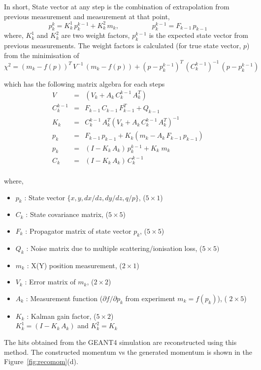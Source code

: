 In short, State vector at any step is the combination of extrapolation from previous
measurement and measurement at that point,
$$  p^k_k = K^1_k \,p^{k-1}_k + K^2_k \,m_k, \hspace{2cm} p_k^{k-1} = F_{k-1}\,p_{k-1}$$
where,  $K^1_k$ and $K^2_k$ are two weight factors, $p^{k-1}_k$ is the expected state
vector from previous measurements. The weight factors is calculated
(for true state vector, $p$) from the minimisation of
$$\chi^2  = (m_k - f(p))^T \,V^{-1}\, (m_k - f(p)) + (p - p_k^{k-1})^T \,(C^{k-1}_k)^{-1} \,(p - p_k^{k-1})$$

which has the following matrix algebra for each steps
\begin{eqnarray*}
  V &=& (V_k + A_k \,C_k^{k-1} \,A_k^T) \\
  C^{k-1}_k &=& F_{k-1}\, C_{k-1}\, F^T_{k-1} + Q_{k-1} \\
  K_k &=& C^{k-1}_k\, A_k^T (V_k + A_k\, C^{k-1}_k\, A_k^T)^{-1} \\
  p_k &=& F_{k-1}\, p_{k-1} + K_k (m_k - A_k \,F_{k-1}\,p_{k-1}) \\
  p_k &=& (I-K_k\,A_k)\, p_k^{k-1} + K_k\;m_k \\
  C_k &=& (I - K_k\, A_k)\, C_k^{k-1} \\
\end{eqnarray*}

where,
\begin{itemize}
\item $p_k$ : State vector $ \{x, y, dx/dz, dy/dz, q/p\}$, ($5 \times 1$)
\item $C_k$ : State covariance matrix, ($5 \times 5$)
\item $F_k$ : Propagator matrix of state vector $p_k$, ($5 \times 5$)
\item $Q_k$ : Noise matrix due to multiple scattering/ionisation loss, ($5 \times5) $
\item $m_k$ : X(Y) position measurement, ($2 \times 1$)
\item $V_k$ : Error matrix of $m_k$, ($2 \times 2$)
\item $A_k$ : Measurement function ($\partial f /\partial p_k$ from experiment $m_k=f(p_k)$), ( $2 \times 5$)
\item $K_k$ :  Kalman gain factor, ($5 \times 2$)  \\
  $K^1_k = (I - K_k\,A_k)$ and $K^2_k = K_k$
\end{itemize}  

The hits obtained from the GEANT4 simulation are reconstructed using
this method. The constructed momentum vs the generated momentum is
shown in the Figure~\ref{fig:recomom}(d).



